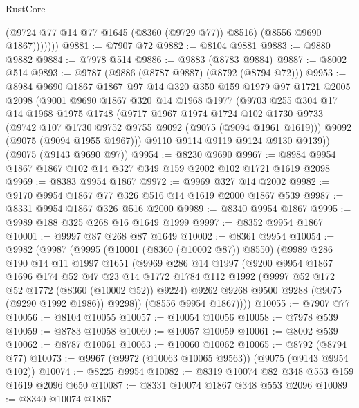 \begin{lexlean}{RustCore}
\begin{coremodule}
                (@9724 @77 @14 @77 @1645 (@8360 (@9729 @77)) @8516)
                (@8556 @9690 @1867)))))))
@9881 := @7907 @72
@9882 := @8104 @9881
@9883 := @9880 @9882
@9884 := @7978 @514
@9886 := @9883 (@8783 @9884)
@9887 := @8002 @514
@9893 := @9787 (@9886 (@8787 @9887) (@8792 (@8794 @72)))
@9953 := @8984
    @9690
    @1867
    @1867
    @97
    @14
    @320
    @350
    @159
    @1979
    @97
    @1721
    @2005
    @2098
    (@9001
      @9690
      @1867
      @320
      @14
      @1968
      @1977
      (@9703
        @255
        @304
        @17
        @14
        @1968
        @1975
        @1748
        (@9717
          @1967
          @1974
          @1724
          @102
          @1730
          @9733
          (@9742 @107 @1730 @9752 @9755 @9092 (@9075 (@9094 @1961 @1619)))
          @9092
          (@9075 (@9094 @1955 @1967)))
        @9110
        @9114
        @9119
        @9124
        @9130
        @9139))
    (@9075 (@9143 @9690 @97))
@9954 := @8230 @9690
@9967 := @8984 @9954 @1867 @1867 @102 @14 @327 @349 @159 @2002 @102 @1721 @1619 @2098
@9969 := @8383 @9954 @1867
@9972 := @9969 @327 @14 @2002
@9982 := @9170 @9954 @1867 @77 @326 @516 @14 @1619 @2000 @1867 @539
@9987 := @8331 @9954 @1867 @326 @516 @2000
@9989 := @8340 @9954 @1867
@9995 := @9989 @188 @325 @268 @16 @1649 @1999
@9997 := @8352 @9954 @1867
@10001 := @9997 @87 @268 @87 @1649
@10002 := @8361 @9954
@10054 := @9982
    (@9987
      (@9995
        (@10001 (@8360 (@10002 @87)) @8550)
        (@9989
          @286
          @190
          @14
          @11
          @1997
          @1651
          (@9969
            @286
            @14
            @1997
            (@9200
              @9954
              @1867
              @1696
              @174
              @52
              @47
              @23
              @14
              @1772
              @1784
              @112
              @1992
              (@9997 @52 @172 @52 @1772 (@8360 (@10002 @52)) @9224)
              @9262
              @9268
              @9500
              @9288
              (@9075 (@9290 @1992 @1986))
              @9298))
          (@8556 @9954 @1867))))
@10055 := @7907 @77
@10056 := @8104 @10055
@10057 := @10054 @10056
@10058 := @7978 @539
@10059 := @8783 @10058
@10060 := @10057 @10059
@10061 := @8002 @539
@10062 := @8787 @10061
@10063 := @10060 @10062
@10065 := @8792 (@8794 @77)
@10073 := @9967 (@9972 (@10063 @10065 @9563)) (@9075 (@9143 @9954 @102))
@10074 := @8225 @9954
@10082 := @8319 @10074 @82 @348 @553 @159 @1619 @2096 @650
@10087 := @8331 @10074 @1867 @348 @553 @2096
@10089 := @8340 @10074 @1867

\end{coremodule}
\end{lexlean}
